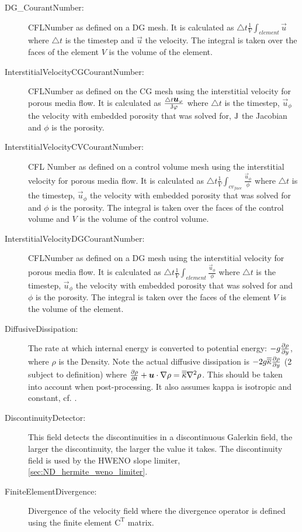 \begin{description}
\item[DG\_CourantNumber:]CFLNumber as defined on a DG mesh. It is calculated as $\triangle t \frac{1}{V} \int _{element} \vec{u}$ where $\triangle t$ is the timestep and $\vec{u}$ the velocity. The integral is taken over the faces of the element $V$ is the volume of the element.
\item[InterstitialVelocityCGCourantNumber:]CFLNumber as defined on the CG mesh using the interstitial velocity for porous media flow. It is calculated as $\frac{\triangle t \vec{u}_{\phi}} {\mat{J} \phi}$ where $\triangle t$ is the timestep, $\vec{u}_{\phi}$ the velocity with embedded porosity that was solved for, $\mat{J}$ the Jacobian and $\phi$ is the porosity. 
\item[InterstitialVelocityCVCourantNumber:]CFL Number as defined on a control volume mesh using the interstitial velocity for porous media flow. It is calculated as $\triangle t \frac{1}{V} \int _{cv_{face}} \frac{\vec{u}_{\phi}}{\phi}$ where $\triangle t$ is the timestep, $\vec{u}_{\phi}$ the velocity with embedded porosity that was solved for and $\phi$ is the porosity. The integral is taken over the faces of the control volume and $V$ is the volume of the control volume.
\item[InterstitialVelocityDGCourantNumber:]CFLNumber as defined on a DG mesh using the interstitial velocity for porous media flow. It is calculated as $\triangle t \frac{1}{V} \int _{element} \frac{\vec{u}_{\phi}}{\phi}$ where $\triangle t$ is the timestep, $\vec{u}_{\phi}$ the velocity with embedded porosity that was solved for and $\phi$ is the porosity. The integral is taken over the faces of the element $V$ is the volume of the element.
\item[DiffusiveDissipation:]The rate at which internal energy is converted to potential energy: $-g\ppx[y]{\rho}$, where $\rho$ is the Density. Note the actual diffusive dissipation is $-2g\tensor{\kappa} \ppx[y]{\rho}$ (2 subject to definition) where $\ppt[t]{\rho} + \vec{u}\cdot \nabla \rho = \tensor{\kappa} \nabla^2 \rho$. This should be taken into account when post-processing. It also assumes kappa is isotropic and constant, cf. \cite{winters1995}.
\item[DiscontinuityDetector:]This field detects the discontinuities in a discontinuous Galerkin field, the larger the discontinuity, the larger the value it takes. The discontinuity field is used by the HWENO slope limiter, \ref{sec:ND_hermite_weno_limiter}.
\item[FiniteElementDivergence:]Divergence of the velocity field where the divergence operator is defined using the finite element $\mathrm{C}^\mathrm{T}$ matrix.

\end{description}
